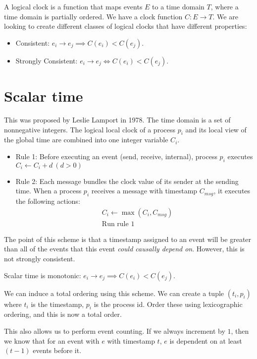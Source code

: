 \documentclass[11pt]{book}
\begin{document}
A logical clock is a function that maps events $E$ to a time domain $T$, where
a time domain is partially ordered. We have a clock function $C: E \rightarrow T$.
We are looking to create different classes of logical clocks that have different
properties:

\begin{itemize}
\item Consistent: $e_i \rightarrow e_j \implies C(e_i) < C(e_j)$.
\item Strongly Consistent: $e_i \rightarrow e_j \iff C(e_i) < C(e_j)$.
\end{itemize}

\section{Scalar time}

This was proposed by Leslie Lamport in 1978. The time domain is a set of
nonnegative integers. The logical local clock of a process $p_i$ and its
local view of the global time are combined into one integer variable $C_i$.


\begin{itemize}
    \item Rule 1: Before executing an event (send, receive, internal), process $p_i$
        executes $C_i \leftarrow C_i + d~(d > 0)$
    \item Rule 2: Each message bundles the clock value of its sender at the sending time.
        When a process $p_i$ receives a message with timestamp $C_{msg}$, it
        executes the following actions:
        \begin{align*}
        &C_i \leftarrow \max (C_i, C_{msg}) \\
        &\text{Run rule 1}
        \end{align*}
\end{itemize}

The point of this scheme is that a timestamp assigned to an event will be 
greater than all of the events that this event \emph{could causally depend on}.
However, this is not strongly consistent.

Scalar time is monotonic: $e_i \rightarrow e_j \implies C(e_i) < C(e_j)$.

We can induce a total ordering using this scheme. We can create a tuple
$(t_i, p_i)$ where $t_i$ is the timestamp, $p_i$ is the process id. Order
these using lexicographic ordering, and this is now a total order.


This also allows us to perform event counting. If we always increment by $1$,
then we know that for an event with $e$ with timestamp $t$, $e$ is dependent
on at least $(t-1)$ events before it.
\end{document}
